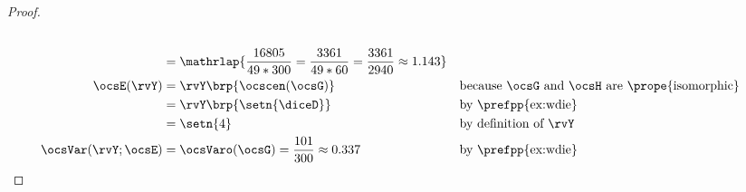 \begin{tabstr}{0.75}
\begin{proof}
\begin{align*}
      \\&= \mathrlap{\frac{16805}{49*300} = \frac{3361}{49*60} = \frac{3361}{2940} \approx 1.143}
      \\
      \ocsE(\rvY)
        &= \rvY\brp{\ocscen(\ocsG)}
        && \text{because $\ocsG$ and $\ocsH$ are \prope{isomorphic}}
      \\&= \rvY\brp{\setn{\diceD}}
        &&\text{by \prefpp{ex:wdie}}
      \\&= \setn{4}
        &&\text{by definition of $\rvY$}
      \\
      \ocsVar(\rvY;\ocsE)
        &= \ocsVaro(\ocsG)
         = \frac{101}{300} \approx 0.337
        &&\text{by \prefpp{ex:wdie}}
    \end{align*}
\end{proof}


\end{tabstr}
